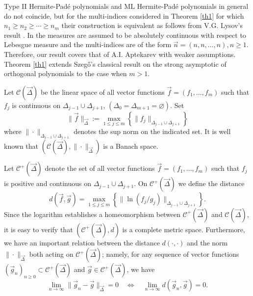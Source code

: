 \documentclass{amsart}
\numberwithin{equation}{section}
\theoremstyle{definition}
\newcommand{\n}{\vec{n}}          %
\begin{document}
    Type II Hermite-Pad\'e polynomials and ML Hermite-Pad\'e polynomials in general do not coincide, but for the multi-indices considered in Theorem \ref{th1} for which $n_1 \geq n_2 \geq \cdots \geq n_m$ their construction is equivalent as follows from V.G. Lysov's result \cite[Proposition 1.1]{lysov20}. In \cite{sasha99} the measures are
    assumed to be absolutely continuous with respect  to Lebesgue measure and the multi-indices are of the form $\n = (n,n,\ldots,n), n \geq 1$. Therefore, our result covers that of A.I. Aptekarev with weaker assumptions. Theorem \ref{th1} extends Szeg\H{o}'s classical result on the strong asymptotic of orthogonal polynomials to the case when $m > 1$.



    Let $\mathcal{C}({\vec{\Delta}})$ be the linear space of all vector functions $\vec{f} = (f_1,\ldots,f_m)$ such that $f_j$ is continuous on $\Delta_{j-1} \cup \Delta_{j+1}$, $(\Delta_0 = \Delta_{m+1} = \varnothing)$. Set
    \[ \|\vec{f}\|_{\vec{\Delta}} :=  \max_{1\leq j\leq m} \left\{ \| f_j \|_{\Delta_{j-1}\cup \Delta_{j+1}}\right\}
    \]
    where $\|\cdot\|_{\Delta_{j-1}\cup \Delta_{j+1}}$ denotes the sup norm on the indicated set. It is well known that
    $(\mathcal{C}({\vec{\Delta}}),\|\cdot\|_{\vec{\Delta}})$ is a Banach space.

    Let $\mathcal{C}^+({\vec{\Delta}})$ denote the set of all vector functions $\vec{f} = (f_1,\ldots,f_m)$ such that $f_j$ is positive and continuous on $\Delta_{j-1} \cup \Delta_{j+1}$.  On $\mathcal{C}^+({\vec{\Delta}})$ we define the distance
    \[ d(\vec{f},\vec{g}) =\max_{1\leq j\leq m} \left\{ \| \ln(f_j/g_j) \|_{\Delta_{j-1}\cup \Delta_{j+1}}\right\}.
    \]
    Since the logarithm establishes a homeomorphism between $\mathcal{C}^+({\vec{\Delta}})$ and $\mathcal{C}({\vec{\Delta}})$, it is easy to verify that
    $(\mathcal{C}^+({\vec{\Delta}}),d)$ is a complete metric space. Furthermore, we have an important relation between the distance $d(\cdot,\cdot)$  and the norm $\|\cdot\|_{\vec{\Delta}}$ both acting on $\mathcal{C}^+({\vec{\Delta}})$; namely, for any sequence of vector functions $(\vec{g}_n)_{n \geq 0} \subset  \mathcal{C}^+({\vec{\Delta}})$  and $\vec{g} \in \mathcal{C}^+({\vec{\Delta}})$, we have
    \begin{equation}
    	\label{equiv}
    	\lim_{n \to \infty} \|\vec{g}_{n}-\vec{g}\|_{\vec{\Delta}} = 0 \quad  \Leftrightarrow \quad \lim_{n \to \infty} d(\vec{g}_{n},\vec{g}) =0.
    \end{equation}
\end{document}
